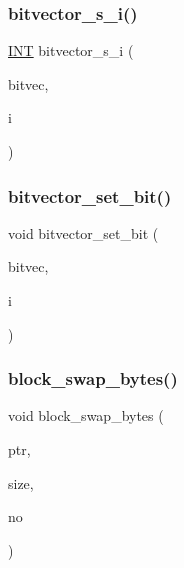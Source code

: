 \subsubsection{\texorpdfstring{bitvector\+\_\+s\+\_\+i()}{bitvector\_s\_i()}}
{\footnotesize\ttfamily \mbox{\hyperlink{galois_8h_a09fddde158a3a20bd2dcadb609de11dc}{I\+NT}} bitvector\+\_\+s\+\_\+i (\begin{DoxyParamCaption}\item[{\mbox{\hyperlink{galois_8h_a122c4acf389c050379f00341fdcd5812}{U\+B\+Y\+TE}} $\ast$}]{bitvec,  }\item[{\mbox{\hyperlink{galois_8h_a09fddde158a3a20bd2dcadb609de11dc}{I\+NT}}}]{i }\end{DoxyParamCaption})}

\mbox{\label{util_8_c_aea2585c3a9817547809788e3c42ff8a0}} 
\subsubsection{\texorpdfstring{bitvector\+\_\+set\+\_\+bit()}{bitvector\_set\_bit()}}
{\footnotesize\ttfamily void bitvector\+\_\+set\+\_\+bit (\begin{DoxyParamCaption}\item[{\mbox{\hyperlink{galois_8h_a122c4acf389c050379f00341fdcd5812}{U\+B\+Y\+TE}} $\ast$}]{bitvec,  }\item[{\mbox{\hyperlink{galois_8h_a09fddde158a3a20bd2dcadb609de11dc}{I\+NT}}}]{i }\end{DoxyParamCaption})}

\mbox{\label{util_8_c_a55c0738dadea7a508621f4af1e9ff8f3}} 
\subsubsection{\texorpdfstring{block\+\_\+swap\+\_\+bytes()}{block\_swap\_bytes()}}
{\footnotesize\ttfamily void block\+\_\+swap\+\_\+bytes (\begin{DoxyParamCaption}\item[{\mbox{\hyperlink{galois_8h_a0d64bfd7d5423ee41bad9366e6e02ec6}{S\+C\+H\+AR}} $\ast$}]{ptr,  }\item[{\mbox{\hyperlink{galois_8h_a09fddde158a3a20bd2dcadb609de11dc}{I\+NT}}}]{size,  }\item[{\mbox{\hyperlink{galois_8h_a09fddde158a3a20bd2dcadb609de11dc}{I\+NT}}}]{no }\end{DoxyParamCaption})}

